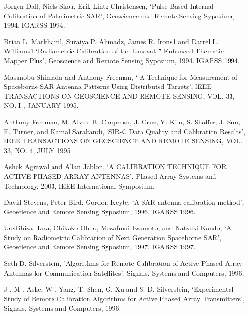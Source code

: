 \documentclass[a4paper,10pt]{article}
\begin{document}
\begin{enumerate}[ {[}1{]} ]
		\item \label{ppr:classic3} Jorgen Dall, Niels Skou, Erik Lintz 
		Christensen, \enquote*{Pulse-Based Internal Calibration of Polarimetric
		SAR}, Geoscience and Remote Sensing Syposium, 1994. IGARSS 1994.

		\item \label{ppr:rad3} Brian L. Markhaml, Suraiya P. Ahmadz, James R. 
		Irons1 and Darrel L. Williams1 \enquote*{Radiometric Calibration of the
		Landsat-7 Enhanced Thematic Mapper Plus}, Geoscience and Remote Sensing
		Syposium, 1994. IGARSS 1994.
		
		\item \label{ppr:dist1} Masanobu Shimada and Anthony Freeman, \enquote*{
		A Technique for Measurement of Spaceborne SAR Antenna Patterns Using 
		Distributed Targets}, IEEE TRANSACTIONS ON GEOSCIENCE AND REMOTE 
		SENSING, VOL. 33, NO. I , JANUARY 1995.
		
		\item \label{ppr:abs-rad-ical1}Anthony Freeman, M. Alves, B. Chapman, J.
		Cruz, Y. Kim, S. Shaffer, J. Sun, E. Turner, and Kamal Sarabandi, 
		\enquote*{SIR-C Data Quality and Calibration Results}, IEEE TRANSACTIONS
		ON GEOSCIENCE AND REMOTE SENSING, VOL. 33, NO. 4, JULY 1995.
		
		\item \label{ppr:mutual1} Ashok Agrawal and Allan Jablon, \enquote*{A 
		CALIBRATION TECHNIQUE FOR ACTIVE PHASED ARRAY ANTENNAS}, Phased Array 
		Systems and Technology, 2003, IEEE International Symposium.
		
		\item \label{ppr:puncTrgt2} David Stevens, Peter Bird, Gordon Keyte, 
		\enquote*{A SAR antenna calibration method}, Geoscience and Remote 
		Sensing Syposium, 1996. IGARSS 1996.
		
		\item \label{ppr:rev1} Uoshihisa Hara, Chikako Ohno, Masafumi Iwamoto, 
		and Natsuki Kondo, \enquote*{A Study on Radiometric Calibration of Next
		Generation Spaceborne SAR}, Geoscience and Remote Sensing Syposium, 
		1997. IGARSS 1997.

		\item \label{ppr:ext1} Seth D. Silverstein, \enquote*{Algorithms for 
		Remote Calibration of Active Phased Array Antennas for Communication 
		Satellites}, Signals, Systems and Computers, 1996.
		
		\item \label{ppr:ext2} J . M . Ashe, W . Yang, T. Shen, G. Xu and S. D.
		Silverstein, \enquote*{Experimental Study of Remote Calibration 
		Algorithms for Active Phased Array Transmitters}, Signals, Systems and
		Computers, 1996.
		

\end{enumerate}
\end{document}

